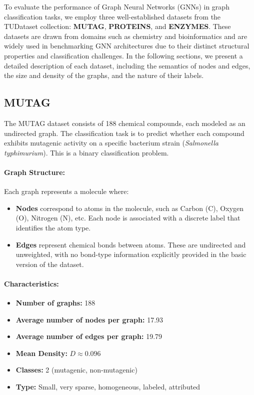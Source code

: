 \documentclass[11pt,a4paper]{article}
\begin{document}
	
	
To evaluate the performance of Graph Neural Networks (GNNs) in graph classification tasks, we employ three well-established datasets from the TUDataset collection: \textbf{MUTAG}, \textbf{PROTEINS}, and \textbf{ENZYMES}. These datasets are drawn from domains such as chemistry and bioinformatics and are widely used in benchmarking GNN architectures due to their distinct structural properties and classification challenges. In the following sections, we present a detailed description of each dataset, including the semantics of nodes and edges, the size and density of the graphs, and the nature of their labels.

\subsection*{MUTAG}

The MUTAG dataset consists of 188 chemical compounds, each modeled as an undirected graph. The classification task is to predict whether each compound exhibits mutagenic activity on a specific bacterium strain (\textit{Salmonella typhimurium}). This is a binary classification problem.

\paragraph{Graph Structure:}
Each graph represents a molecule where:
\begin{itemize}
	\item \textbf{Nodes} correspond to atoms in the molecule, such as Carbon (C), Oxygen (O), Nitrogen (N), etc. Each node is associated with a discrete label that identifies the atom type.
	\item \textbf{Edges} represent chemical bonds between atoms. These are undirected and unweighted, with no bond-type information explicitly provided in the basic version of the dataset.
\end{itemize}

\paragraph{Characteristics:}
\begin{itemize}
	\item \textbf{Number of graphs:} 188
	\item \textbf{Average number of nodes per graph:} 17.93
	\item \textbf{Average number of edges per graph:} 19.79
		\item \textbf{Mean Density:} $D \approx 0.096$
	\item \textbf{Classes:} 2 (mutagenic, non-mutagenic)
	\item \textbf{Type:} Small, very sparse, homogeneous, labeled, attributed
\end{itemize}
\end{document}
